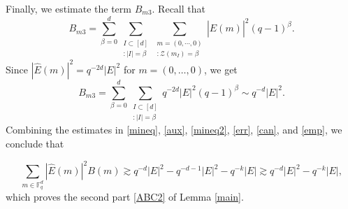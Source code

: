\documentclass[a4paper,11pt]{amsart}
\numberwithin{equation}{section}
\begin{document}
Finally, we estimate the term $B_{m3}$.  Recall that
\begin{equation*}
    B_{m3} = \sum_{\beta = 0}^d\sum_{\substack{I \subset [d] \\ :|I| = \beta}} \sum_{\substack{{ m = (0,\cdots,0)}  \\  { :\mathcal{Z}(m_I) = \beta}}} |\widehat{E}(m)|^2 (q - 1)^{\beta}.
\end{equation*}
Since $|\widehat{E}(m)|^2 = q^{-2d} |E|^2$ for \( m = (0, \ldots, 0) \), we get
\begin{equation}\label{emp}
    B_{m3} = 
    \sum_{\beta = 0}^d\sum_{\substack{I \subset [d] \\ :|I| = \beta}} q^{-2d}|E|^2(q - 1)^{\beta} \sim q^{-d}|E|^2.
\end{equation}
Combining the estimates in \eqref{mineq}, \eqref{aux}, \eqref{mineq2}, \eqref{err}, \eqref{can}, and \eqref{emp}, we conclude that

\begin{equation*}
    \sum_{m \in \mathbb{F}_q^d} |\widehat{E}(m)|^2 B(m) \gtrsim q^{-d}|E|^2 - q^{-d-1}|E|^2 - q^{-k}|E| \gtrsim q^{-d}|E|^2 - q^{-k}|E|,
\end{equation*}
which proves the second part \ref{ABC2} of Lemma \ref{main}.
\end{document}
